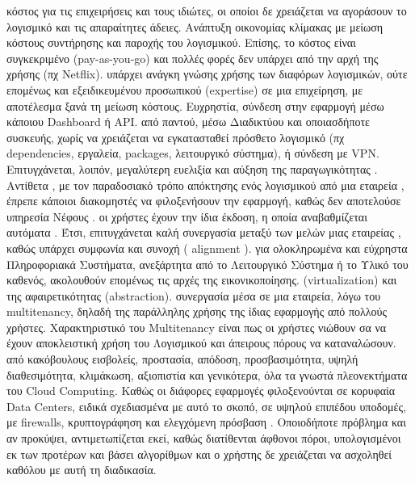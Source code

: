 \documentclass{article}
\begin{document}
\begin{itemize}
     κόστος για τις επιχειρήσεις και τους ιδιώτες, οι οποίοι δε χρειάζεται να αγοράσουν το λογισμικό και τις απαραίτητες άδειες. Ανάπτυξη οικονομίας κλίμακας με μείωση κόστους συντήρησης και παροχής του λογισμικού. Επίσης, το κόστος είναι συγκεκριμένο (pay-as-you-go) και πολλές φορές δεν υπάρχει από την αρχή της χρήσης (πχ Netflix). 
     υπάρχει ανάγκη γνώσης χρήσης των διαφόρων λογισμικών, ούτε επομένως και εξειδικευμένου προσωπικού  (expertise)  σε μια επιχείρηση, με αποτέλεσμα ξανά τη μείωση κόστους. Ευχρηστία, σύνδεση στην εφαρμογή μέσω κάποιου Dashboard ή API.
     από παντού, μέσω Διαδικτύου και οποιασδήποτε συσκευής, χωρίς να χρειάζεται να εγκατασταθεί πρόσθετο λογισμικό (πχ dependencies, εργαλεία, packages, λειτουργικό σύστημα), ή σύνδεση με VPN. Επιτυγχάνεται, λοιπόν, μεγαλύτερη ευελιξία και αύξηση της παραγωγικότητας  . Αντίθετα , με τον παραδοσιακό τρόπο απόκτησης ενός λογισμικού από μια εταιρεία , έπρεπε κάποιοι διακομηστές να φιλοξενήσουν την εφαρμογή, καθώς δεν αποτελούσε υπηρεσία Νέφους .
     οι χρήστες έχουν την ίδια έκδοση, η οποία αναβαθμίζεται αυτόματα . Έτσι, επιτυγχάνεται καλή συνεργασία μεταξύ των μελών μιας εταιρείας , καθώς υπάρχει συμφωνία και συνοχή ( alignment ).
     για ολοκληρωμένα και εύχρηστα Πληροφοριακά Συστήματα, ανεξάρτητα από το Λειτουργικό Σύστημα ή το Υλικό του καθενός, ακολουθούν επομένως τις αρχές της εικονικοποίησης. (virtualization) και της αφαιρετικότητας (abstraction).
     συνεργασία μέσα σε μια εταιρεία, λόγω του multitenancy, δηλαδή της παράλληλης χρήσης της ίδιας εφαρμογής από πολλούς χρήστες. Χαρακτηριστικό του Multitenancy είναι πως οι χρήστες νιώθουν σα να έχουν αποκλειστική χρήση του Λογισμικού και άπειρους πόρους να καταναλώσουν.
     από κακόβουλους εισβολείς, προστασία, απόδοση, προσβασιμότητα, υψηλή διαθεσιμότητα, κλιμάκωση, αξιοπιστία και γενικότερα, όλα τα γνωστά πλεονεκτήματα του Cloud Computing. Καθώς οι διάφορες εφαρμογές φιλοξενούνται σε κορυφαία Data Centers, ειδικά σχεδιασμένα με αυτό το σκοπό, σε υψηλού επιπέδου υποδομές, με firewalls, κρυπτογράφηση και ελεγχόμενη πρόσβαση . Οποιοδήποτε πρόβλημα και αν προκύψει, αντιμετωπίζεται εκεί, καθώς διατίθενται άφθονοι πόροι, υπολογισμένοι εκ των προτέρων και βάσει αλγορίθμων και ο χρήστης δε χρειάζεται να ασχοληθεί καθόλου με αυτή τη διαδικασία.

\end{itemize}
\end{document}
